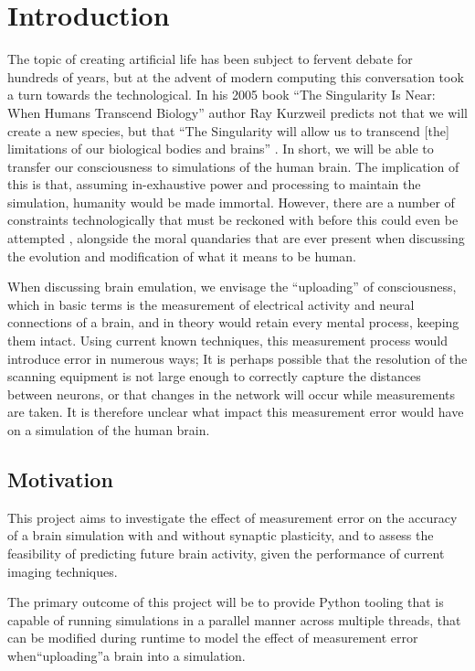 \chapter{Introduction}

The topic of creating artificial life has been subject to fervent debate for
hundreds of years, but at the advent of modern computing this conversation took
a turn towards the technological. In his 2005 book “The Singularity Is Near:
When Humans Transcend Biology” author Ray Kurzweil predicts not that we will
create a new species, but that “The Singularity will allow us to transcend [the]
limitations of our biological bodies and brains”
\parencite{kurzweil_singularity_2006}.
In short, we will be able to transfer our
consciousness to simulations of the human brain. The implication of this is
that, assuming in-exhaustive power and processing to maintain the simulation,
humanity would be made immortal. However, there are a number of constraints
technologically that must be reckoned with before this could even be attempted
\parencite{bostrom_whole_2008}, alongside the moral quandaries that are ever
present when discussing the evolution and modification of what it means to be
human. 

When discussing brain emulation, we envisage the “uploading” of
consciousness, which in basic terms is the measurement of electrical activity
and neural connections of a brain, and in theory would retain every mental
process, keeping them intact. Using current known techniques, this
measurement process would introduce error in numerous ways; It is perhaps
possible that the resolution of the scanning equipment is not large enough to
correctly capture the distances between neurons, or that changes in the network
will occur while measurements are taken. It is therefore unclear what impact
this measurement error would have on a simulation of the human brain. 

\section{Motivation}

This project aims to investigate the effect of measurement error on the accuracy
of a brain simulation with and without synaptic plasticity, and to assess the
feasibility of predicting future brain activity, given the performance of
current imaging techniques.

The primary outcome of this project will be to provide Python tooling that is
capable of running simulations in a parallel manner across multiple threads,
that can be modified during runtime to model the effect of measurement error
when“uploading”a brain into a simulation. 

